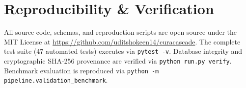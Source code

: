 \documentclass[conference]{IEEEtran}
\begin{document}
\section*{Reproducibility \& Verification}
All source code, schemas, and reproduction scripts are open-source under the MIT License at \url{https://github.com/uditshokeen14/curacascade}. 
The complete test suite (47 automated tests) executes via \texttt{pytest -v}. Database integrity and cryptographic SHA-256 provenance are verified via \texttt{python run.py verify}. Benchmark evaluation is reproduced via \texttt{python -m pipeline.validation_benchmark}.



\end{document}
